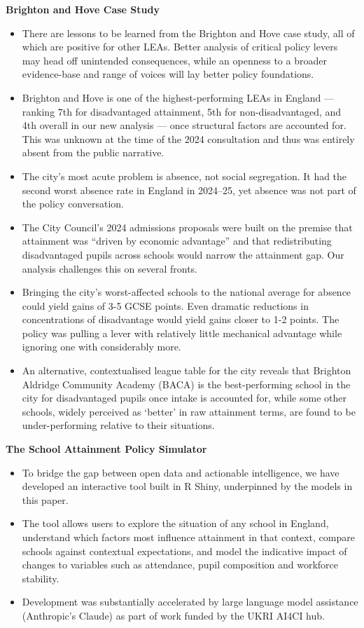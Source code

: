 \documentclass[
  11pt,
]{article}
\providecommand{\tightlist}{%
  \setlength{\itemsep}{0pt}\setlength{\parskip}{0pt}}
\begin{document}
\textbf{Brighton and Hove Case Study}

\begin{itemize}
\tightlist
\item
  There are lessons to be learned from the Brighton and Hove case study,
  all of which are positive for other LEAs. Better analysis of critical
  policy levers may head off unintended consequences, while an openness
  to a broader evidence-base and range of voices will lay better policy
  foundations.
\item
  Brighton and Hove is one of the highest-performing LEAs in England ---
  ranking 7th for disadvantaged attainment, 5th for non-disadvantaged,
  and 4th overall in our new analysis --- once structural factors are
  accounted for. This was unknown at the time of the 2024 consultation
  and thus was entirely absent from the public narrative.
\item
  The city's most acute problem is absence, not social segregation. It
  had the second worst absence rate in England in 2024--25, yet absence
  was not part of the policy conversation.
\item
  The City Council's 2024 admissions proposals were built on the premise
  that attainment was ``driven by economic advantage'' and that
  redistributing disadvantaged pupils across schools would narrow the
  attainment gap. Our analysis challenges this on several fronts.
\item
  Bringing the city's worst-affected schools to the national average for
  absence could yield gains of 3-5 GCSE points. Even dramatic reductions
  in concentrations of disadvantage would yield gains closer to 1-2
  points. The policy was pulling a lever with relatively little
  mechanical advantage while ignoring one with considerably more.
\item
  An alternative, contextualised league table for the city reveals that
  Brighton Aldridge Community Academy (BACA) is the best-performing
  school in the city for disadvantaged pupils once intake is accounted
  for, while some other schools, widely perceived as `better' in raw
  attainment terms, are found to be under-performing relative to their
  situations.
\end{itemize}

\textbf{The School Attainment Policy Simulator}

\begin{itemize}
\tightlist
\item
  To bridge the gap between open data and actionable intelligence, we
  have developed an interactive tool built in R Shiny, underpinned by
  the models in this paper.
\item
  The tool allows users to explore the situation of any school in
  England, understand which factors most influence attainment in that
  context, compare schools against contextual expectations, and model
  the indicative impact of changes to variables such as attendance,
  pupil composition and workforce stability.
\item
  Development was substantially accelerated by large language model
  assistance (Anthropic's Claude) as part of work funded by the UKRI
  AI4CI hub.
\end{itemize}
\end{document}
